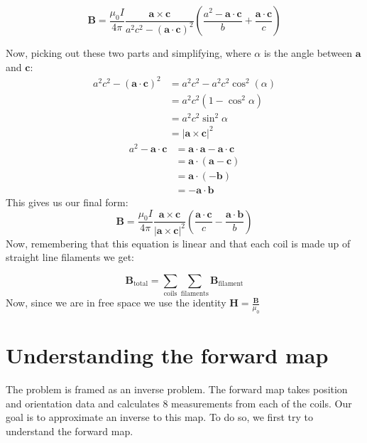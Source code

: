 \begin{equation}
\mathbf{B} = \frac{\mu_0 I}{4\pi} \frac{\mathbf{a}\times \mathbf{c}}{a^2c^2 - \left(\mathbf{a} \cdot \mathbf{c}\right)^2} \left( \frac{a^2 - \mathbf{a}\cdot\mathbf{c}}{b} + \frac{\mathbf{a} \cdot \mathbf{c}}{c} \right)
\end{equation}

Now, picking out these two parts and simplifying, where $\alpha$ is the angle between $\mathbf{a}$ and $\mathbf{c}$:
\begin{align*}
  a^2c^2 - \left( \mathbf{a} \cdot \mathbf{c} \right)^2 &= a^2c^2 - a^2c^2\cos^2(\alpha) \\
                               &= a^2c^2(1 - \cos^2\alpha) \\
                               &= a^2c^2\sin^2\alpha \\
                               &= \left \vert \mathbf{a} \times \mathbf{c} \right \vert ^2
\end{align*}
\begin{align*}
  a^2 - \mathbf{a} \cdot \mathbf{c} &= \mathbf{a} \cdot \mathbf{a} - \mathbf{a} \cdot \mathbf{c} \\
                              &= \mathbf{a} \cdot \left(\mathbf{a} - \mathbf{c}\right) \\
                              &= \mathbf{a} \cdot (-\mathbf{b}) \\
                              &= - \mathbf{a} \cdot \mathbf{b}
\end{align*}
This gives us our final form:
\begin{equation}\label{eq:biot_savart_final}
  \mathbf{B} = \frac{\mu_0 I}{4\pi} \frac{\mathbf{a} \times \mathbf{c}}{\left \vert \mathbf{a} \times \mathbf{c} \right \vert^2 } \left( \frac{\mathbf{a} \cdot \mathbf{c}}{c} - \frac{\mathbf{a} \cdot \mathbf{b}}{b} \right)
\end{equation}
Now, remembering that this equation is linear and that each coil is made up of straight line filaments we get:

\begin{equation}
\mathbf{B}_{\text{total}} = \sum_{\text{coils}} \sum_{\text{filaments}}  \mathbf{B}_{\text{filament}} 
\end{equation}
Now, since we are in free space we use the identity $\mathbf{H} = \frac{\mathbf{B}}{\mu_0}$ \cite[p.~285]{griffiths2013}

\section{Understanding the forward map}\label{sec:forward-map}
The problem is framed as an inverse problem. The forward map takes position and orientation data and calculates 8 measurements from each of the coils. Our goal is to approximate an inverse to this map. To do so, we first try to understand the forward map. 
